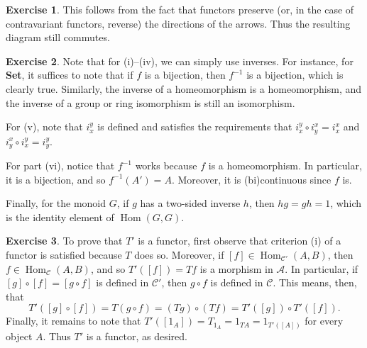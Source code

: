 \documentclass{article}
\theoremstyle{definition}
\newtheorem{intex}{Exercise}[section]
\newenvironment{exercise}{\begin{intex}\label{\theintex}}{\end{intex}}
\DeclareMathOperator\Hom{Hom}
\newcommand*\cat[1]{\mathcal{#1}}
\newcommand*\Cat[1]{\textbf{#1}}
\newcommand*\Set{\Cat{Set}}
\begin{document}
\begin{exercise}
This follows from the fact that functors preserve (or, in the case of contravariant functors, reverse) the directions of the arrows. Thus the resulting diagram still commutes. 
\end{exercise} 

\begin{exercise}
Note that for (i)--(iv), we can simply use inverses. For instance, for \Set, it suffices to note that if $f$ is a bijection, then $f^{-1}$ is a bijection, which is clearly true. Similarly, the inverse of a homeomorphism is a homeomorphism, and the inverse of a group or ring isomorphism is still an isomorphism. 

For (v), note that $i_x^y$ is defined and satisfies the requirements that $i_x^y\circ i_y^x=i_x^x$ and $i_y^x\circ i_x^y=i_y^y$. 

For part (vi), notice that $f^{-1}$ works because $f$ is a homeomorphism. In particular, it is a bijection, and so $f^{-1}(A')=A$. Moreover, it is (bi)continuous since $f$ is. 

Finally, for the monoid $G$, if $g$ has a two-sided inverse $h$, then $hg=gh=1$, which is the identity element of $\Hom(G,G)$. 
\end{exercise} 

\begin{exercise}
To prove that $T'$ is a functor, first observe that criterion (i) of a functor is satisfied because $T$ does so. Moreover, if $[f]\in\Hom_{\cat C'}(A,B)$, then $f\in\Hom_{\cat C}(A,B)$, and so $T'([f])=Tf$ is a morphism in $\cat A$. In particular, if $[g]\circ[f]=[g\circ f]$ is defined in $\cat C'$, then $g\circ f$ is defined in $\cat C$. This means, then, that \[T'([g]\circ[f])=T(g\circ f)=(Tg)\circ(Tf)=T'([g])\circ T'([f]).\] Finally, it remains to note that $T'([1_A])=T_{1_A}=1_{TA}=1_{T'([A])}$ for every object $A$. Thus $T'$ is a functor, as desired. 
\end{exercise} 
\end{document}
